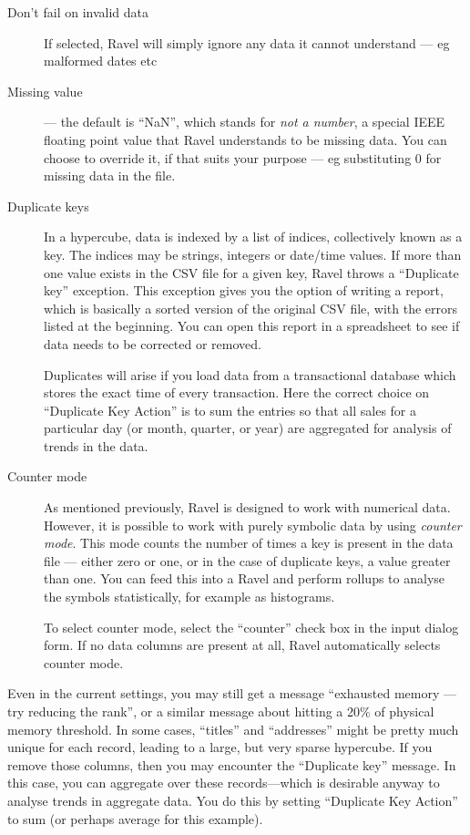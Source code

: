 \begin{description}
  \item[Don't fail on invalid data] If selected, Ravel will simply
    ignore any data it cannot understand --- eg malformed dates etc
  \item[Missing value] --- the default is ``NaN'', which stands for
    {\em not a number}, a special IEEE floating point value that Ravel
    understands to be missing data. You can choose to override it, if
    that suits your purpose --- eg substituting 0 for missing data in
    the file.
  \item[Duplicate keys]

    In a hypercube, data is indexed by a list of indices, collectively
    known as a key. The indices may be strings, integers or date/time
    values. If more than one value exists in the CSV file for a given
    key, Ravel throws a ``Duplicate key'' exception. This exception
    gives you the option of writing a report, which is basically a sorted
    version of the original CSV file, with the errors listed at the beginning.
    You can open this report in a spreadsheet to see if data needs to
    be corrected or removed.
    
    Duplicates will arise if you load data from a transactional database
    which stores the exact time of every transaction. Here the correct
    choice on ``Duplicate Key Action'' is to sum the entries so that
    all sales for a particular day (or month, quarter, or year) are aggregated
    for analysis of trends in the data.

  \item[Counter mode]
  \label{counter}
  
  As mentioned previously, Ravel is designed to work with numerical
  data. However, it is possible to work with purely symbolic data by
  using {\em counter mode}. This mode counts the
  number of times a key is present in the data file --- either zero or
  one, or in the case of duplicate keys, a value greater than one. You
  can feed this into a Ravel and perform rollups to analyse the symbols
  statistically, for example as histograms.
  
  To select counter mode, select the ``counter'' check box in the input
  dialog form. If no data columns are present at all, Ravel
  automatically selects counter mode.
\end{description}

Even in the current settings, you may still get a message ``exhausted
memory --- try reducing the rank'', or a similar message about hitting
a 20\% of physical memory threshold. In some cases, ``titles'' and
``addresses'' might be pretty much unique for each record, leading
to a large, but very sparse hypercube. If you remove those columns,
then you may encounter the ``Duplicate key'' message. In this case,
you can aggregate over these records---which is desirable anyway
to analyse trends in aggregate data. You do this by setting ``Duplicate
Key Action'' to sum (or perhaps average for this example).

